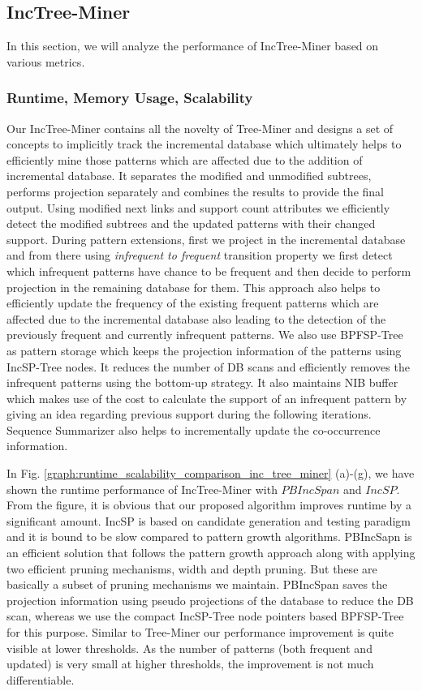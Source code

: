 \subsection{IncTree-Miner}
In this section, we will analyze the performance of IncTree-Miner based on various metrics.

\subsubsection{Runtime, Memory Usage, Scalability}
Our IncTree-Miner contains all the novelty of Tree-Miner and designs a set of concepts to implicitly track the incremental database which ultimately helps to efficiently mine those patterns which are affected due to the addition of incremental database. It separates the modified and unmodified subtrees, performs projection separately and combines the results to provide the final output. Using modified next links and support count attributes we efficiently detect the modified subtrees and the updated patterns with their changed support. During pattern extensions, first we project in the incremental database and from there using \textit{infrequent to frequent} transition property we first detect which infrequent patterns have chance to be frequent and then decide to perform projection in the remaining database for them. This approach also helps to efficiently update the frequency of the existing frequent patterns which are affected due to the incremental database also leading to the detection of the previously frequent and currently infrequent patterns. We also use BPFSP-Tree as pattern storage which keeps the projection information of the patterns using IncSP-Tree nodes. It reduces the number of DB scans and efficiently removes the infrequent patterns using the bottom-up strategy. It also maintains NIB buffer which makes use of the cost to calculate the support of an infrequent pattern by giving an idea regarding previous support during the following iterations. Sequence Summarizer also helps to incrementally update the co-occurrence information.


In Fig. \ref{graph:runtime_scalability_comparison_inc_tree_miner} (a)-(g), we have shown the runtime performance of IncTree-Miner with $PBIncSpan$ and $IncSP$. From the figure, it is obvious that our proposed algorithm improves runtime by a significant amount. IncSP is based on candidate generation and testing paradigm and it is bound to be slow compared to pattern growth algorithms. PBIncSapn is an efficient solution that follows the pattern growth approach along with applying two efficient pruning mechanisms, width and depth pruning. But these are basically a subset of pruning mechanisms we maintain. PBIncSpan saves the projection information using pseudo projections of the database to reduce the DB scan, whereas we use the compact IncSP-Tree node pointers based BPFSP-Tree for this purpose. Similar to Tree-Miner our performance improvement is quite visible at lower thresholds. As the number of patterns (both frequent and updated) is very small at higher thresholds, the improvement is not much differentiable.

